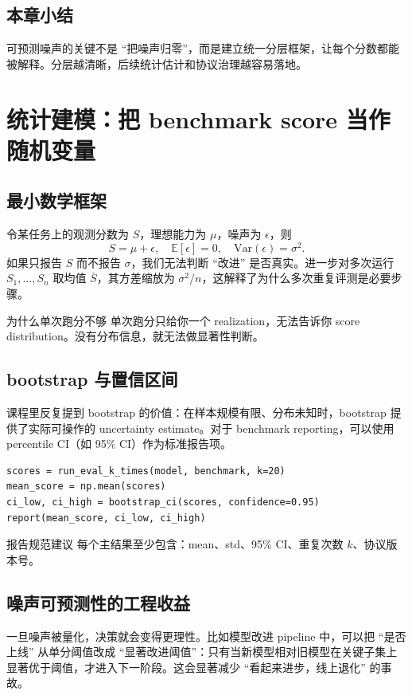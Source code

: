 \documentclass[a4paper]{article}
\begin{document}
\subsection{本章小结}
可预测噪声的关键不是 ``把噪声归零''，而是建立统一分层框架，让每个分数都能被解释。分层越清晰，后续统计估计和协议治理越容易落地。

\section{统计建模：把 benchmark score 当作随机变量}

\subsection{最小数学框架}
令某任务上的观测分数为 $S$，理想能力为 $\mu$，噪声为 $\epsilon$，则
$$
S = \mu + \epsilon,\quad \mathbb{E}[\epsilon]=0,\quad \mathrm{Var}(\epsilon)=\sigma^2.
$$
如果只报告 $S$ 而不报告 $\sigma$，我们无法判断 ``改进'' 是否真实。进一步对多次运行 $S_1,\dots,S_n$ 取均值 $\bar{S}$，其方差缩放为 $\sigma^2/n$，这解释了为什么多次重复评测是必要步骤。

\begin{knowledgebox}{为什么单次跑分不够}
单次跑分只给你一个 realization，无法告诉你 score distribution。没有分布信息，就无法做显著性判断。
\end{knowledgebox}

\subsection{bootstrap 与置信区间}
课程里反复提到 bootstrap 的价值：在样本规模有限、分布未知时，bootstrap 提供了实际可操作的 uncertainty estimate。对于 benchmark reporting，可以使用 percentile CI（如 95\% CI）作为标准报告项。

\begin{lstlisting}[caption={Benchmark 置信区间计算的最小伪代码}]
scores = run_eval_k_times(model, benchmark, k=20)
mean_score = np.mean(scores)
ci_low, ci_high = bootstrap_ci(scores, confidence=0.95)
report(mean_score, ci_low, ci_high)
\end{lstlisting}

\begin{importantbox}{报告规范建议}
每个主结果至少包含：mean、std、95\% CI、重复次数 $k$、协议版本号。
\end{importantbox}

\subsection{噪声可预测性的工程收益}
一旦噪声被量化，决策就会变得更理性。比如模型改进 pipeline 中，可以把 ``是否上线'' 从单分阈值改成 ``显著改进阈值''：只有当新模型相对旧模型在关键子集上显著优于阈值，才进入下一阶段。这会显著减少 ``看起来进步，线上退化'' 的事故。
\end{document}
